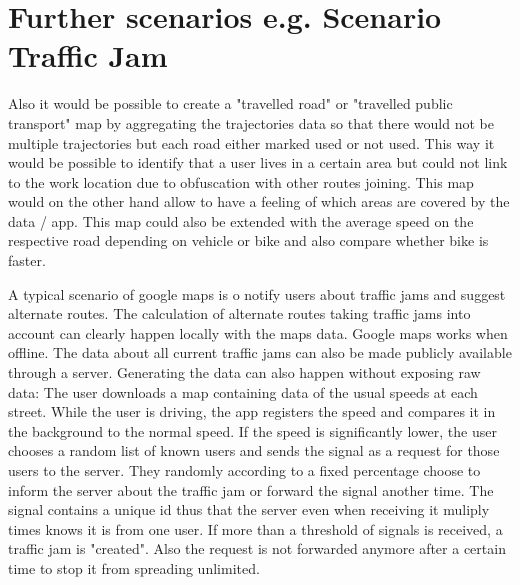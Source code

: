 \section{Further scenarios e.g. Scenario Traffic Jam}
Also it would be possible to create a "travelled road" or "travelled public transport" map by aggregating the trajectories data so that there would not be multiple trajectories but each road either marked used or not used. This way it would be possible to identify that a user lives in a certain area but could not link to the work location due to obfuscation with other routes joining. This map would on the other hand allow to have a feeling of which areas are covered by the data / app. This map could also be extended with the average speed on the respective road depending on vehicle or bike and also compare whether bike is faster.

A typical scenario of google maps is o notify users about traffic jams and suggest alternate routes. The calculation of alternate routes taking traffic jams into account can clearly happen locally with the maps data. Google maps works when offline. The data about all current traffic jams can also be made publicly available through a server. Generating the data can also happen without exposing raw data: The user downloads a map containing data of the usual speeds at each street. While the user is driving, the app registers the speed and compares it in the background to the normal speed. If the speed is significantly lower, the user chooses a random list of known users and sends the signal as a request for those users to the server. They randomly according to a fixed percentage choose to inform the server about the traffic jam or forward the signal another time. The signal contains a unique id thus that the server even when receiving it muliply times knows it is from one user. If more than a threshold of signals is received, a traffic jam is "created". Also the request is not forwarded anymore after a certain time to stop it from spreading unlimited.

